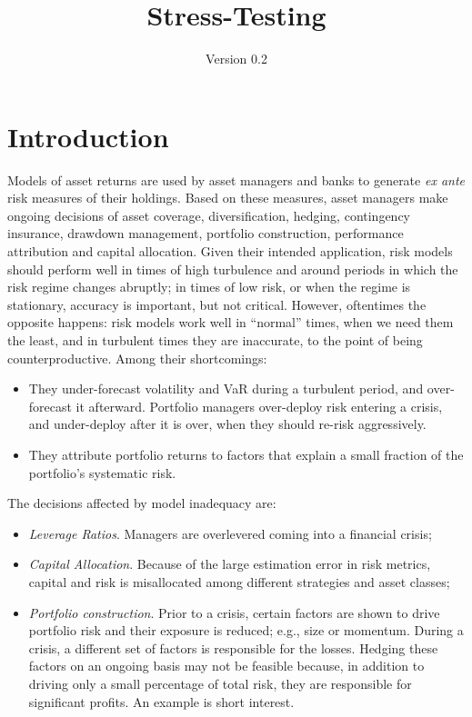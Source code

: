 \documentclass[letter, 12pt]{article}
\title{Stress-Testing}
\author{Version 0.2}
\date{}
\begin{document}
\maketitle


 

\section{Introduction}

Models of asset returns are used by asset managers and banks to generate \emph{ex ante} risk measures of their holdings. Based on these measures, asset managers make ongoing decisions of asset coverage, diversification, hedging, contingency insurance, drawdown management, portfolio construction, performance attribution and capital allocation. Given their intended application, risk models should perform well in times of high turbulence and around periods in which the risk regime changes abruptly; in times of low risk, or when the regime is stationary, accuracy is important, but not critical. However, oftentimes the opposite happens: risk models work well in ``normal'' times, when we need them the least, and in turbulent times they are inaccurate, to the point of being counterproductive. Among their shortcomings:
\begin{itemize}
\item They under-forecast volatility and VaR during a turbulent period, and over-forecast it afterward. Portfolio managers over-deploy risk entering a crisis, and under-deploy after it is over, when they should re-risk aggressively.
\item They attribute portfolio returns to factors that explain a small fraction of the portfolio's systematic risk.
\end{itemize}
The decisions affected by model inadequacy are:
\begin{itemize}
\item \emph{Leverage Ratios}. Managers are overlevered coming into a financial crisis;
\item \emph{Capital Allocation}. Because of the large estimation error in risk metrics, capital and risk is misallocated among different strategies and asset classes;
\item \emph{Portfolio construction}. Prior to a crisis, certain factors are shown to drive portfolio risk and their exposure is reduced; e.g., size or momentum. During a crisis, a different set of factors is responsible for the losses. Hedging these factors on an ongoing basis may not be feasible because, in addition to driving only a small percentage of total risk, they are responsible for significant profits. An example is short interest.
\end{itemize}
\end{document}
